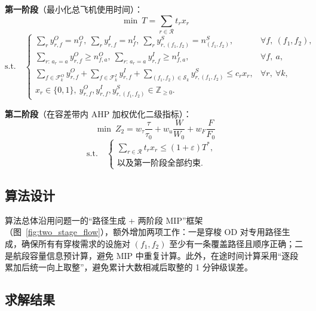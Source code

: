 \documentclass[withoutpreface]{cumcmthesis}
\begin{document}
\textbf{第一阶段}（最小化总飞机使用时间）：
\begin{equation}
\min \ T = \sum_{r \in \mathcal{R}} t_r x_r
\end{equation}
\begin{equation}
\text{s.t.} \quad
\begin{cases}
\sum_{r} y^{O}_{r,f} = n^{O}_f,\ \sum_{r} y^{I}_{r,f} = n^{I}_f,\ \sum_{r} y^{S}_{r,(f_1,f_2)} = n^{S}_{(f_1,f_2)}, & \forall f,\ (f_1,f_2),\\[2pt]
\sum_{r:\, a_r = a} y^{O}_{r,f} \geq n^{O}_{f,a},\ \sum_{r:\, a_r = a} y^{I}_{r,f} \geq n^{I}_{f,a}, & \forall f,\ a,\\[2pt]
\sum_{f \in \mathcal{F}^{O}_k} y^{O}_{r,f} + \sum_{f \in \mathcal{F}^{I}_k} y^{I}_{r,f} + \sum_{(f_1,f_2) \in \mathcal{S}_k} y^{S}_{r,(f_1,f_2)} \leq c_r x_r, & \forall r,\ \forall k,\\[2pt]
x_r \in \{0,1\},\ y^{O}_{r,f}, y^{I}_{r,f}, y^{S}_{r,(f_1,f_2)} \in \mathbb{Z}_{\geq 0}.
\end{cases}
\end{equation}

\textbf{第二阶段}（在容差带内 AHP 加权优化二级指标）：
\begin{equation}
\min \ Z_2 = w_\tau \frac{\tau}{\tau_0} + w_u \frac{W}{W_0} + w_F \frac{F}{F_0}
\end{equation}
\begin{equation}
\text{s.t.} \quad
\begin{cases}
\sum_{r \in \mathcal{R}} t_r x_r \leq (1+\varepsilon) T^*, & \\
\text{以及第一阶段全部约束}. &
\end{cases}
\end{equation}

\subsection{算法设计}

算法总体沿用问题一的“路径生成 + 两阶段 MIP”框架（图~\ref{fig:two_stage_flow}），额外增加两项工作：一是穿梭 OD 对专用路径生成，确保所有有穿梭需求的设施对 $(f_1, f_2)$ 至少有一条覆盖路径且顺序正确；二是航段容量信息预计算，避免 MIP 中重复计算。此外，在途时间计算采用“逐段累加后统一向上取整”，避免累计大数相减后取整的 1 分钟级误差。

\subsection{求解结果}
\end{document}
